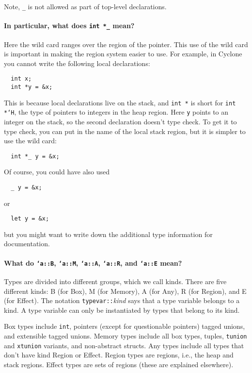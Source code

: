 Note, \texttt{_} is not allowed as part of top-level declarations.

\paragraph{In particular, what does \texttt{int *_} mean?}

Here the wild card ranges over the region of the pointer.  This use of
the wild card is important in making the region system easier to use.
For example, in Cyclone you cannot write the following local declarations:
\begin{verbatim}
  int x;
  int *y = &x;
\end{verbatim}
This is because local declarations live on the stack, and \texttt{int
  *} is short for \texttt{int *`H}, the type of pointers to integers
in the heap region.  Here \texttt{y} points to an integer on the
stack, so the second declaration doesn't type check.  To get it to
type check, you can put in the name of the local stack region, but it
is simpler to use the wild card:
\begin{verbatim}
  int *_ y = &x;
\end{verbatim}
Of course, you could have also used
\begin{verbatim}
  _ y = &x;
\end{verbatim}
or
\begin{verbatim}
  let y = &x;
\end{verbatim}
but you might want to write down the additional type information for
documentation.

\paragraph{What do \texttt{`a::B}, \texttt{`a::M}, \texttt{`a::A},
  \texttt{`a::R}, and \texttt{`a::E} mean?}

Types are divided into different groups, which we call kinds.  There
are five different kinds: B (for Box), M (for Memory), A (for Any), R
(for Region), and E (for Effect).  The notation
\texttt{typevar}\texttt{::}\textit{kind} says that a type variable
belongs to a kind.  A type variable can only be instantiated by types
that belong to its kind.

Box types include \texttt{int}, pointers (except for questionable
pointers) tagged unions, and extensible tagged unions.
Memory types include all box types, tuples, \texttt{tunion} and
\texttt{xtunion} variants, and non-abstract structs.
Any types include all types that don't have kind Region or Effect.
Region types are regions, i.e., the heap and stack regions.
Effect types are sets of regions (these are explained elsewhere).


